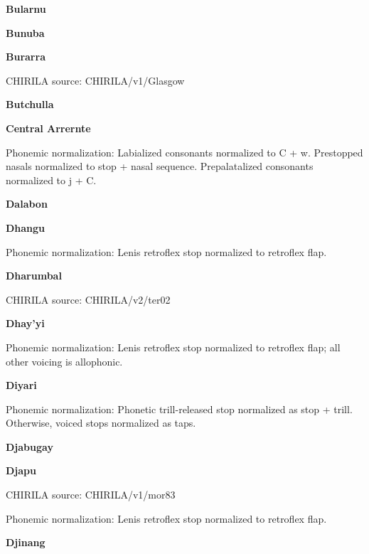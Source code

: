 \textbf{Bularnu}


\textbf{Bunuba}


\textbf{Burarra}

CHIRILA source: CHIRILA/v1/Glasgow


\textbf{Butchulla}


\textbf{Central Arrernte}


Phonemic normalization: Labialized consonants normalized to C + w.
Prestopped nasals normalized to stop + nasal sequence. Prepalatalized
consonants normalized to j + C.

\textbf{Dalabon}


\textbf{Dhangu}


Phonemic normalization: Lenis retroflex stop normalized to retroflex
flap.

\textbf{Dharumbal}

CHIRILA source: CHIRILA/v2/ter02


\textbf{Dhay'yi}


Phonemic normalization: Lenis retroflex stop normalized to retroflex
flap; all other voicing is allophonic.

\textbf{Diyari}


Phonemic normalization: Phonetic trill-released stop normalized as stop
+ trill. Otherwise, voiced stops normalized as taps.

\textbf{Djabugay}


\textbf{Djapu}

CHIRILA source: CHIRILA/v1/mor83


Phonemic normalization: Lenis retroflex stop normalized to retroflex
flap.

\textbf{Djinang}

